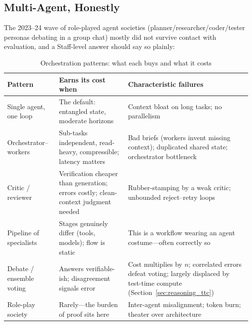 \subsection{Multi-Agent, Honestly}

The 2023--24 wave of role-played agent societies (planner/researcher/coder/tester personas debating in a group chat) mostly did not survive contact with evaluation, and a Staff-level answer should say so plainly:

\begin{table}[H]
\centering
\caption{Orchestration patterns: what each buys and what it costs}
\label{tab:orchestration_patterns}
\begin{tabularx}{\textwidth}{p{3.0cm}XX}
\toprule
\textbf{Pattern} & \textbf{Earns its cost when} & \textbf{Characteristic failures} \\
\midrule
Single agent, one loop & The default: entangled state, moderate horizons & Context bloat on long tasks; no parallelism \\
Orchestrator--workers & Sub-tasks independent, read-heavy, compressible; latency matters & Bad briefs (workers invent missing context); duplicated shared state; orchestrator bottleneck \\
Critic / reviewer & Verification cheaper than generation; errors costly; clean-context judgment needed & Rubber-stamping by a weak critic; unbounded reject--retry loops \\
Pipeline of specialists & Stages genuinely differ (tools, models); flow is static & This is a workflow wearing an agent costume---often correctly so \\
Debate / ensemble voting & Answers verifiable-ish; disagreement signals error & Cost multiplies by $n$; correlated errors defeat voting; largely displaced by test-time compute (Section~\ref{sec:reasoning_ttc}) \\
Role-play society & Rarely---the burden of proof sits here & Inter-agent misalignment; token burn; theater over architecture \\
\bottomrule
\end{tabularx}
\end{table}

